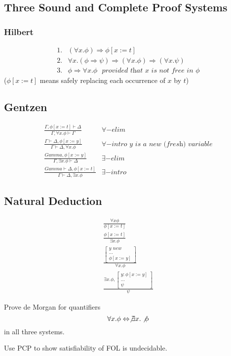 \subsection{Three Sound and Complete Proof Systems}
\subsubsection{Hilbert}
\[
\begin{split}
1. &(\forall x. \phi) \Rightarrow \phi[x:=t]  \\
2. &\forall x. (\phi \Rightarrow \psi) \Rightarrow (\forall x. \phi) \Rightarrow (\forall x. \psi) \\ 
3. & \phi \Rightarrow \forall x. \phi ~~~ \textit{provided that } x \textit{ is not free in } \phi
\end{split}
\]
($\phi[x:=t]$ means safely replacing each occurrence of $x$ by $t$) \\

\subsection{Gentzen}
\[
\begin{split}
\frac{\Gamma, \phi[x:=t] \vdash \Delta}{\Gamma, \forall x. \phi \vdash \Gamma} &  \forall-elim \\
\frac{\Gamma \vdash \Delta, \phi[x:=y]}{\Gamma \vdash \Delta, \forall x. \phi} &  \forall-intro \textit{ y is a new (fresh) variable} \\
\frac{Gamma, \phi[x:=y]}{\Gamma, \exists x. \phi \vdash \Delta} & \exists-elim \\ 
\frac{Gamma \vdash \Delta, \phi[x:=t]}{\Gamma \vdash \Delta, \exists x. \phi} & \exists-intro
\end{split}
\]

\subsection{Natural Deduction}
\[
\begin{split}
    \frac{\forall x \phi}{\phi[x:=t]} \\ 
    \frac{\phi[x:=t]}{\exists x. \phi} \\ 
    \frac{\begin{bmatrix}
        y \textit{ new} \\ 
        ...\\
        \phi[x:=y]
    \end{bmatrix}}{\forall x. \phi} \\ 
    \frac{ \exists x. \phi, \begin{bmatrix}
        y: \phi[x:=y] \\ 
        ...\\
        \psi 
    \end{bmatrix}}{\psi}
\end{split}
\]

\begin{homework} Prove de Morgan for quantifiers 
\[
\forall x. \phi \Leftrightarrow \not \exists x. \not \phi
\]
in all three systems. 
\end{homework}

\begin{homework}
	 Use PCP to show satisfiability of FOL is undecidable. 
\end{homework}